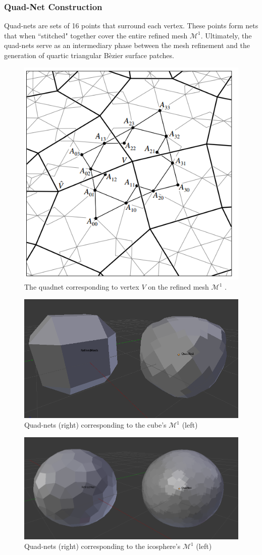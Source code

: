 \documentclass[11pt]{article}
\begin{document}
	\subsubsection*{Quad-Net Construction}
	Quad-nets are sets of 16 points that surround each vertex. These points form nets that when ``stitched" together cover the entire refined mesh $\mathcal{M}^1$. Ultimately, the quad-nets serve as an intermediary phase between the mesh refinement and the generation of quartic triangular B\`ezier surface patches. 
	\begin{figure}[bp!]
		\centering
		\captionsetup{justification=centering}
		\includegraphics[width=.5\linewidth]{img/loop_quad_net}
		\caption{The quadnet corresponding to vertex $V$ on the refined mesh $\mathcal{M}^1$ \cite{loop1994smooth}.}			
	\end{figure} 	
	\begin{figure}[bp!]
		\vspace{0.35in}
		\centering
		\captionsetup{justification=centering}
		\includegraphics[width=.7\linewidth]{img/quad_cube}
		\caption{Quad-nets (right) corresponding to the cube's $\mathcal{M}^1$ (left)}	
	\end{figure}
	
	\pagebreak
	
	\vspace{0.25in}

	\begin{figure}[h]
		\centering
		\captionsetup{justification=centering}
		\includegraphics[width=.7\linewidth]{img/quad_icosphere}
		\caption{Quad-nets (right) corresponding to the icosphere's $\mathcal{M}^1$ (left)}	
	\end{figure}
	
\end{document}
